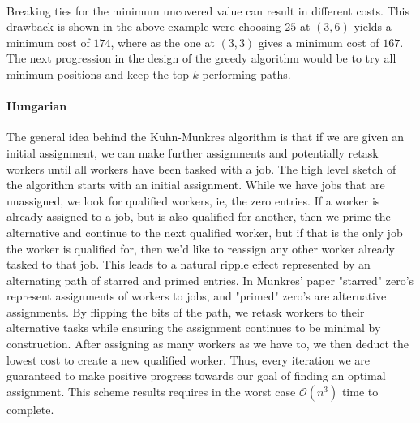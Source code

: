 \documentclass{article}
\newcommand{\boundedBy}[1]{\mathcal{O} \left ( #1 \right )}
\begin{document}
\paragraph{} Breaking ties for the minimum uncovered value can result in different costs. This drawback is shown in the above example were choosing $25$ at $(3,6)$ yields a minimum cost of $174$, where as the one at $(3, 3)$ gives a minimum cost of $167$. The next progression in the design of the greedy algorithm would be to try all minimum positions and keep the top $k$ performing paths.

\paragraph{Hungarian} The general idea behind the Kuhn-Munkres algorithm is that if we are given an initial assignment, we can make further assignments and potentially retask workers until all workers have been tasked with a job. The high level sketch of the algorithm starts with an initial assignment. While we have jobs that are unassigned, we look for qualified workers, ie, the zero entries. If a worker is already assigned to a job, but is also qualified for another, then we prime the alternative and continue to the next qualified worker, but if that is the only job the worker is qualified for, then we'd like to reassign any other worker already tasked to that job. This leads to a natural ripple effect represented by an alternating path of starred and primed entries. In Munkres' paper \cite{munkres1957algorithms} "starred" zero's represent assignments of workers to jobs, and "primed" zero's are alternative assignments. By flipping the bits of the path, we retask workers to their alternative tasks while ensuring the assignment continues to be minimal by construction. After assigning as many workers as we have to, we then deduct the lowest cost to create a new qualified worker. Thus, every iteration we are guaranteed to make positive progress towards our goal of finding an optimal assignment. This scheme results requires in the worst case $\boundedBy{n^3}$ time to complete.
\end{document}
